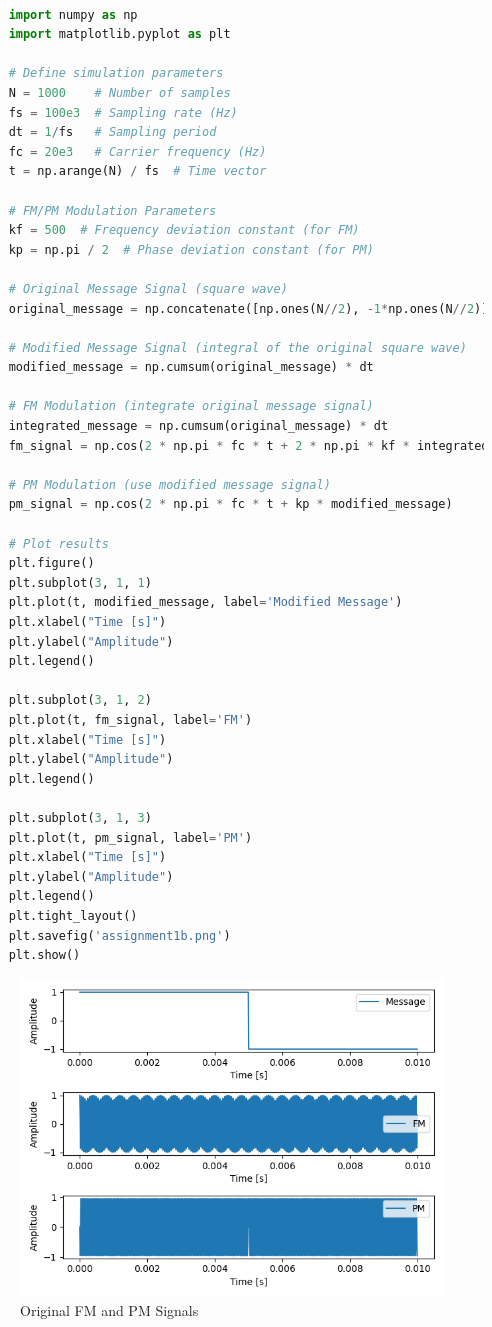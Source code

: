 \documentclass[
	letterpaper, %
	10pt, %
]{CSUniSchoolLabReport}
\begin{document}
\begin{lstlisting}[language=Python]
	
	import numpy as np
	import matplotlib.pyplot as plt
	
	# Define simulation parameters
	N = 1000    # Number of samples
	fs = 100e3  # Sampling rate (Hz)
	dt = 1/fs   # Sampling period
	fc = 20e3   # Carrier frequency (Hz)
	t = np.arange(N) / fs  # Time vector
	
	# FM/PM Modulation Parameters
	kf = 500  # Frequency deviation constant (for FM)
	kp = np.pi / 2  # Phase deviation constant (for PM)
	
	# Original Message Signal (square wave)
	original_message = np.concatenate([np.ones(N//2), -1*np.ones(N//2)])
	
	# Modified Message Signal (integral of the original square wave)
	modified_message = np.cumsum(original_message) * dt
	
	# FM Modulation (integrate original message signal)
	integrated_message = np.cumsum(original_message) * dt
	fm_signal = np.cos(2 * np.pi * fc * t + 2 * np.pi * kf * integrated_message)
	
	# PM Modulation (use modified message signal)
	pm_signal = np.cos(2 * np.pi * fc * t + kp * modified_message)
	
	# Plot results
	plt.figure()
	plt.subplot(3, 1, 1)
	plt.plot(t, modified_message, label='Modified Message')
	plt.xlabel("Time [s]")
	plt.ylabel("Amplitude")
	plt.legend()
	
	plt.subplot(3, 1, 2)
	plt.plot(t, fm_signal, label='FM')
	plt.xlabel("Time [s]")
	plt.ylabel("Amplitude")
	plt.legend()
	
	plt.subplot(3, 1, 3)
	plt.plot(t, pm_signal, label='PM')
	plt.xlabel("Time [s]")
	plt.ylabel("Amplitude")
	plt.legend()
	plt.tight_layout()
	plt.savefig('assignment1b.png')
	plt.show()

\end{lstlisting}

\begin{figure}[H] %
	\centering %
	\includegraphics[width=1.2\textwidth]{assignment1a.png} %
	\caption{Original FM and PM Signals}
	\label{fig:block}
\end{figure}
\end{document}

